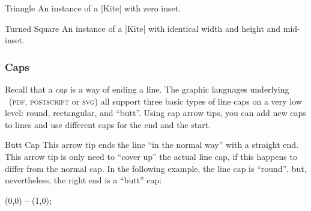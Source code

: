 \begin{arrowtipsimple}{Triangle}
    An instance of a |Kite| with zero inset.
    \begin{arrowexamples}
        \arrowexample[]
        \arrowexampledup[sep]
        \arrowexampledupdot[sep]
        \arrowexample[open]
        \arrowexample[length=4pt]
        \arrowexample[angle=45:1pt 3]
        \arrowexample[angle=60:1pt 3]
        \arrowexample[angle=90:1pt 3]
        \arrowexample[round]
        \arrowexample[slant=.3]
        \arrowexample[left]
        \arrowexample[right]
        \arrowexample[red]
    \end{arrowexamples}
\end{arrowtipsimple}

\begin{arrowtipsimple}{Turned Square}
    An instance of a |Kite| with identical width and height and mid-inset.
    \begin{arrowexamples}
        \arrowexample[]
        \arrowexampledup[sep]
        \arrowexampledupdot[sep]
        \arrowexample[open]
        \arrowexample[length=4pt]
        \arrowexample[round]
        \arrowexample[slant=.3]
        \arrowexample[left]
        \arrowexample[right]
        \arrowexample[red]
    \end{arrowexamples}
\end{arrowtipsimple}


\subsubsection{Caps}

Recall that a \emph{cap} is a way of ending a line. The graphic languages
underlying \tikzname\ (\textsc{pdf}, \textsc{postscript} or \textsc{svg}) all
support three basic types of line caps on a very low level: round, rectangular,
and ``butt''. Using cap arrow tips, you can add new caps to lines and use
different caps for the end and the start.

\begin{arrowtipsimple}{Butt Cap}
    This arrow tip ends the line ``in the normal way'' with a straight end.
    This arrow tip is only need to ``cover up'' the actual line cap, if this
    happens to differ from the normal cap. In the following example, the line
    cap is ``round'', but, nevertheless, the right end is a ``butt'' cap:
\begin{codeexample}[preamble={\usetikzlibrary{arrows.meta}}]
\tikz \draw [line width=1ex, line cap=round, -Butt Cap] (0,0) -- (1,0);
\end{codeexample}
\end{arrowtipsimple}

